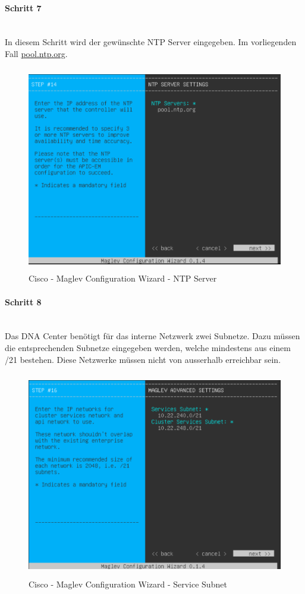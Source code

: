 \paragraph{Schritt 7}
~\\
In diesem Schritt wird der gewünschte NTP Server eingegeben. Im vorliegenden Fall \url{pool.ntp.org}.
\begin{figure}[H]
	\centering
	\includegraphics[height=9cm]{img/installguide/installguide-step14.PNG}
	\caption{Cisco - Maglev Configuration Wizard - NTP Server}
	\label{fig:installguide-dna-center-install-step-14}
\end{figure} 

\paragraph{Schritt 8}
~\\
Das DNA Center benötigt für das interne Netzwerk zwei Subnetze. Dazu müssen die entsprechenden Subnetze eingegeben werden, welche mindestens aus einem /21 bestehen. Diese Netzwerke müssen nicht von ausserhalb erreichbar sein.
\begin{figure}[H]
	\centering
	\includegraphics[height=9cm]{img/installguide/installguide-step16.PNG}
	\caption{Cisco - Maglev Configuration Wizard - Service Subnet}
	\label{fig:installguide-dna-center-install-step-16}
\end{figure} 

